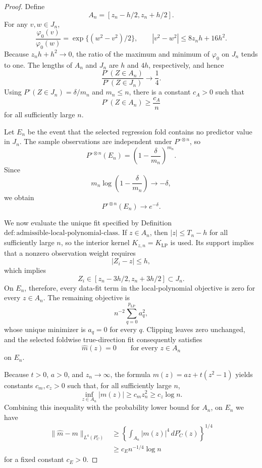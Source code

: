\documentclass{article}
\begin{document}
\begin{proof}
Define
\[
A_n=[z_n-h/2,z_n+h/2].
\]
For any \(v,w\in J_n\),
\[
\frac{\varphi_0(v)}{\varphi_0(w)}
=\exp\{(w^2-v^2)/2\},
\qquad
|v^2-w^2|\le8z_nh+16h^2.
\]
Because \(z_nh+h^2\to0\), the ratio of the maximum and minimum of \(\varphi_0\) on \(J_n\) tends to one. The lengths of \(A_n\) and \(J_n\) are \(h\) and \(4h\), respectively, and hence
\[
\frac{P^\circ(Z\in A_n)}{P^\circ(Z\in J_n)}\longrightarrow\frac14.
\]
Using \(P^\circ(Z\in J_n)=\delta/m_n\) and \(m_n\le n\), there is a constant \(c_A>0\) such that
\[
P^\circ(Z\in A_n)\ge\frac{c_A}{n}
\]
for all sufficiently large \(n\).

Let \(E_n\) be the event that the selected regression fold contains no predictor value in \(J_n\). The sample observations are independent under \(P^{\circ\otimes n}\), so
\[
P^{\circ\otimes n}(E_n)
=\left(1-\frac{\delta}{m_n}\right)^{m_n}.
\]
Since
\[
m_n\log\left(1-\frac{\delta}{m_n}\right)\longrightarrow-\delta,
\]
we obtain
\[
P^{\circ\otimes n}(E_n)\longrightarrow e^{-\delta}.
\]

We now evaluate the unique fit specified by Definition \(\mathrm{def:admissible\text{-}local\text{-}polynomial\text{-}class}\). If \(z\in A_n\), then \(|z|\le T_n-h\) for all sufficiently large \(n\), so the interior kernel \(K_{z,n}=K_{\mathrm{LP}}\) is used. Its support implies that a nonzero observation weight requires
\[
|Z_i-z|\le h,
\]
which implies
\[
Z_i\in[z_n-3h/2,z_n+3h/2]\subset J_n.
\]
On \(E_n\), therefore, every data-fit term in the local-polynomial objective is zero for every \(z\in A_n\). The remaining objective is
\[
n^{-2}\sum_{q=0}^{p_{\mathrm{LP}}}a_q^2,
\]
whose unique minimizer is \(a_q=0\) for every \(q\). Clipping leaves zero unchanged, and the selected foldwise true-direction fit consequently satisfies
\[
\widehat m(z)=0\qquad\text{for every }z\in A_n
\]
on \(E_n\).

Because \(t>0\), \(a>0\), and \(z_n\to\infty\), the formula \(m(z)=az+t(z^2-1)\) yields constants \(c_m,c_z>0\) such that, for all sufficiently large \(n\),
\[
\inf_{z\in A_n}|m(z)|\ge c_mz_n^2\ge c_z\log n.
\]
Combining this inequality with the probability lower bound for \(A_n\), on \(E_n\) we have
\[
\begin{aligned}
\|\widehat m-m\|_{L^4(P^\circ_C)}
&\ge\left\{\int_{A_n}|m(z)|^4\,dP^\circ_C(z)\right\}^{1/4}\\
&\ge c_E n^{-1/4}\log n
\end{aligned}
\]
for a fixed constant \(c_E>0\).


\end{proof}
\end{document}
